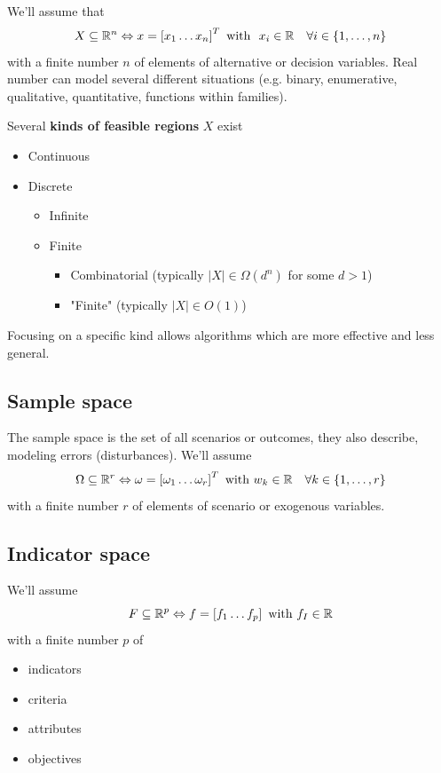We'll assume that 
$$ X \subseteq \mathbb{R}^n \Leftrightarrow x = \left[x_1 \dots x_n \right]^T \text{ with } \ x_i \in \mathbb{R} \quad \forall i \in \{1, \dots, n\} $$
with a finite number $n$ of elements of alternative or decision variables. Real number can model several different situations (e.g. binary, enumerative, qualitative, quantitative, functions within families).

Several \textbf{kinds of feasible regions} $X$ exist
\begin{itemize}
	\item Continuous
	
	\item Discrete
	\begin{itemize}
		\item Infinite
		
		\item Finite
		\begin{itemize}
			\item Combinatorial (typically $|X| \in \Omega(d^n)$ for some $d > 1$)
			
			\item "Finite" (typically $|X| \in O(1)$)
		\end{itemize}
	\end{itemize}
\end{itemize}
Focusing on a specific kind allows algorithms which are more effective and less general.

\subsection{Sample space}
\label{subsec:samplespacedef}

The sample space is the set of all scenarios or outcomes, they also describe, modeling errors (disturbances). We'll assume 
$$ \Omega \subseteq \mathbb{R}^r \Leftrightarrow \omega = \left[\omega_1 \dots \omega_r \right]^T \text{ with } w_k \in \mathbb{R} \quad \forall k \in \{1, \dots, r\} $$
with a finite number $r$ of elements of scenario or exogenous variables.

\subsection{Indicator space}
\label{subsec:indicatorspacedef}

We'll assume 
$$ F \subseteq \mathbb{R}^p \Leftrightarrow f = \left[f_1 \dots f_p\right] \text{ with } f_I \in \mathbb{R} $$
with a finite number $p$ of 
\begin{itemize}
	\item indicators
	
	\item criteria
	
	\item attributes
	
	\item objectives
\end{itemize}

